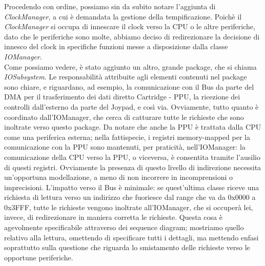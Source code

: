 \documentclass[11pt]{article}
\begin{document}
Procedendo con ordine, possiamo sin da subito notare l'aggiunta di \emph{ClockManager}, a cui è demandata la gestione della tempificazione. Poichè il \emph{ClockManager} si occupa di innescare il clock verso la CPU o le altre periferiche, dato che le periferiche sono molte, abbiamo deciso di redirezionare la decisione di innesco del clock in specifiche funzioni messe a disposizione dalla classe \emph{IOManager}.\\
Come possiamo vedere, è stato aggiunto un altro, grande package, che si chiama \emph{IOSubsystem}. Le responsabilità attribuite agli elementi contenuti nel package sono chiare, e riguardano, ad esempio, la comunicazione con il Bus da parte del DMA per il trasferimento dei dati diretto Cartridge - PPU, la ricezione dei controlli dall'esterno da parte del Joypad, e così via. Ovviamente, tutto quanto è coordinato dall'IOManager, che cerca di catturare tutte le richieste che sono inoltrate verso questo package. Da notare che anche la PPU è trattata dalla CPU come una periferica esterna; nella fattispecie, i registri memory-mapped per la comunicazione con la PPU sono mantenuti, per praticità, nell'IOManager: la comunicazione della CPU verso la PPU, o viceversa, è consentita tramite l'ausilio di questi registri.
\clearpage
Ovviamente la presenza di questo livello di indirezione necessita un'opportuna modellazione, a meno di non incorrere in incomprensioni o imprecisioni. L'impatto verso il Bus è minimale: se quest'ultima classe riceve una richiesta di lettura verso un indirizzo che fuoriesce dal range che va da 0x0000 a 0x3FFF, tutte le richieste vengono inoltrate all'IOManager, che si occuperà lei, invece, di redirezionare in maniera corretta le richieste. Questa cosa è agevolmente specificabile attraverso dei sequence diagram; mostriamo quello relativo alla lettura, omettendo di specificare tutti i dettagli, ma mettendo enfasi soprattutto sulla questione che riguarda lo smistamento delle richieste verso le opportune periferiche.
\end{document}
